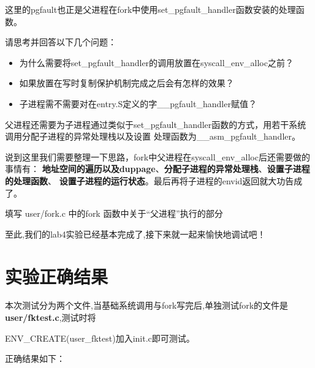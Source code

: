 这里的pgfault也正是父进程在fork中使用set\_pgfault\_handler函数安装的处理函数。

\begin{thinking}\label{think:pgfault-user-2}
请思考并回答以下几个问题：
\begin{itemize}
  \item 为什么需要将set\_pgfault\_handler的调用放置在syscall\_env\_alloc之前？
  \item 如果放置在写时复制保护机制完成之后会有怎样的效果？
  \item 子进程需不需要对在entry.S定义的字\_\_pgfault\_handler赋值？
\end{itemize}
\end{thinking}

父进程还需要为子进程通过类似于set\_pgfault\_handler函数的方式，用若干系统调用分配子进程的异常处理栈以及设置
处理函数为\_\_asm\_pgfault\_handler。

说到这里我们需要整理一下思路，fork中父进程在syscall\_env\_alloc后还需要做的事情有：
\textbf{地址空间的遍历以及duppage}、\textbf{分配子进程的异常处理栈}、\textbf{设置子进程的处理函数}、
\textbf{设置子进程的运行状态}。最后再将子进程的envid返回就大功告成了。

\begin{exercise}
 填写 user/fork.c 中的fork 函数中关于“父进程”执行的部分
\end{exercise}

至此,我们的lab4实验已经基本完成了,接下来就一起来愉快地调试吧！

\section{实验正确结果}

本次测试分为两个文件,当基础系统调用与fork写完后,单独测试fork的文件是\textbf{user/fktest.c},测试时将

ENV\_CREATE(user\_fktest)加入init.c即可测试。

正确结果如下：

